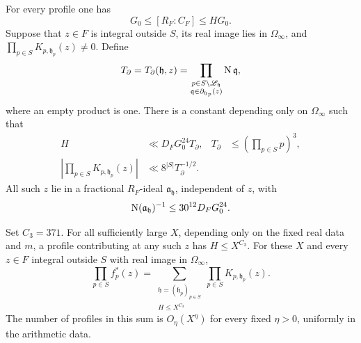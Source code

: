 \begin{lemma}
\label{lem:add-profile-bounds}
For every profile one has
\begin{equation}
 G_0\le [R_F:C_F]\le H G_0.
 \label{eq:add-profile-indices}
\end{equation}
Suppose that \(z\in F\) is integral outside \(S\), its real image lies in
\(\Omega_\infty\), and
\(\prod_{p\in S}K_{p,\mathfrak h_p}(z)\ne0\).  Define
\[
 T_\partial=T_\partial(\mathfrak h,z)
   =\prod_{\substack{p\in S\setminus\mathscr L_{\mathfrak h}\\
                     \mathfrak q\in\partial_{\mathfrak h_p}(z)}}
       \operatorname{N}\mathfrak q ,
\]
where an empty product is one.  There is a constant depending only on
\(\Omega_\infty\) such that
\begin{align}
 H&\ll D_FG_0^{24}T_\partial,
 &T_\partial&\le\left(\prod_{p\in S}p\right)^3,
 \label{eq:add-profile-norm}\\
 \left|\prod_{p\in S}K_{p,\mathfrak h_p}(z)\right|
   &\ll 8^{|S|}T_\partial^{-1/2}.
 \label{eq:add-profile-inverse}
\end{align}
All such \(z\) lie in a fractional \(R_F\)-ideal
\(\mathfrak a_{\mathfrak h}\), independent of \(z\), with
\begin{equation}
 \operatorname{N}(\mathfrak a_{\mathfrak h})^{-1}
       \le 30^{12}D_FG_0^{24}.
 \label{eq:add-profile-support}
\end{equation}

Set \(C_3=371\).  For all sufficiently large \(X\), depending only on the
fixed real data and \(m\), a profile contributing at any such \(z\) has
\(H\le X^{C_3}\).  For these \(X\) and every \(z\in F\) integral outside
\(S\) with real image in \(\Omega_\infty\),
\begin{equation}
 \prod_{p\in S}f_p^*(z)
  =\sum_{\substack{\mathfrak h=(\mathfrak h_p)_{p\in S}\\H\le X^{C_3}}}
        \prod_{p\in S}K_{p,\mathfrak h_p}(z).
 \label{eq:add-profile-expansion}
\end{equation}
The number of profiles in this sum is \(O_\eta(X^\eta)\) for every fixed
\(\eta>0\), uniformly in the arithmetic data.
\end{lemma}

